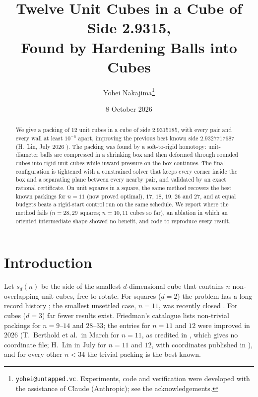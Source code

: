 \documentclass[11pt]{article}
\title{Twelve Unit Cubes in a Cube of Side 2.9315,\\ Found by Hardening Balls into Cubes}
\author{Yohei Nakajima\thanks{\texttt{yohei@untapped.vc}. Experiments, code and verification were developed with the assistance of Claude (Anthropic); see the acknowledgements.}}
\date{8 October 2026}
\begin{document}
\maketitle

\begin{abstract}
We give a packing of 12 unit cubes in a cube of side $2.9315185$, with every pair and every wall at least $10^{-6}$ apart, improving the previous best known side $2.9327717687$ (H.~Lin, July 2026 \cite{hyra}). The packing was found by a soft-to-rigid homotopy: unit-diameter balls are compressed in a shrinking box and then deformed through rounded cubes into rigid unit cubes while inward pressure on the box continues. The final configuration is tightened with a constrained solver that keeps every corner inside the box and a separating plane between every nearby pair, and validated by an exact rational certificate. On unit squares in a square, the same method recovers the best known packings for $n=11$ (now proved optimal), $17$, $18$, $19$, $26$ and $27$, and at equal budgets beats a rigid-start control run on the same schedule. We report where the method fails ($n=28,29$ squares; $n=10,11$ cubes so far), an ablation in which an oriented intermediate shape showed no benefit, and code to reproduce every result.
\end{abstract}

\section{Introduction}
Let $s_d(n)$ be the side of the smallest $d$-dimensional cube that contains $n$ non-overlapping unit cubes, free to rotate. For squares ($d=2$) the problem has a long record history \cite{erdosgraham,stromquist,friedmansurvey,squaresproject}; the smallest unsettled case, $n=11$, was recently closed \cite{squaresproject}. For cubes ($d=3$) far fewer results exist. Friedman's catalogue \cite{friedmancubes} lists non-trivial packings for $n=9$--$14$ and $28$--$33$; the entries for $n=11$ and $12$ were improved in 2026 (T.~Berthold et al.\ in March for $n=11$, as credited in \cite{friedmancubes}, which gives no coordinate file; H.~Lin in July for $n=11$ and $12$, with coordinates published in \cite{hyra}), and for every other $n<34$ the trivial packing is the best known.
\end{document}
